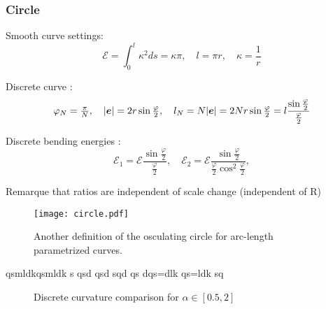 \subsubsection{Circle}

Smooth curve settings:
\begin{equation}
	\mathcal{E} = \int_0^l \kappa^2 ds = \kappa \pi,
	\quad
	l = \pi r,
	\quad
	\kappa = \frac{1}{r}
\end{equation}

Discrete curve :
\begin{equation}
	\varphi_N = \tfrac{\pi}{N},
	\quad
	|\boldsymbol{e}| = 2r\sin \tfrac{\varphi}{2},
	\quad
	l_N = N|\boldsymbol{e}| =2Nr\sin \tfrac{\varphi}{2} = l \frac{\sin \tfrac{\varphi}{2}}{\tfrac{\varphi}{2}}
\end{equation}

Discrete bending energies :
\begin{equation}
	\mathcal{E}_1 = \mathcal{E} \frac{\sin \tfrac{\varphi}{2}}{\tfrac{\varphi}{2}},
	\quad
	\mathcal{E}_2 = \mathcal{E} \frac{\sin \tfrac{\varphi}{2}}{\tfrac{\varphi}{2} \cos^2 \tfrac{\varphi}{2}},
\end{equation}

Remarque that ratios are independent of scale change (independent of R)

\begin{figure}[H]
\begin{center}
\texttt{[image: circle.pdf]}
\caption{Another definition of the osculating circle for arc-length parametrized curves.}
\label{fig:1_1}
\end{center}
\end{figure}

qsmldkqsmldk s qsd qsd
 sqd
  qs dqs=dlk qs=ldk sq
\newpage
\begin{figure}[]
\begin{center}
\end{center}
\caption{Discrete curvature comparison for $\alpha \in [0.5,2]$}
\end{figure}

